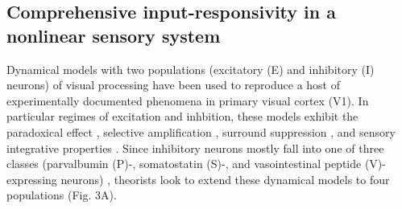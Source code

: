 \documentclass[11pt]{article}
\begin{document}
%
%
%
\subsection{Comprehensive input-responsivity in a nonlinear sensory system}
Dynamical models with two populations (excitatory (E) and inhibitory (I) neurons) of visual processing have been used to reproduce a host of experimentally documented phenomena in primary visual cortex (V1).  In particular regimes of excitation and inhbition, these models exhibit the paradoxical effect \cite{tsodyks1997paradoxical}, selective amplification \cite{murphy2009balanced}, surround suppression \cite{ozeki2009inhibitory}, and  sensory integrative properties \cite{rubin2015stabilized}.  Since inhibitory neurons mostly fall into one of three classes (parvalbumin (P)-, somatostatin (S)-, and vasointestinal peptide (V)-expressing neurons) \cite{markram2004interneurons, rudy2011three}, theorists look to extend these dynamical models to four populations \cite{litwin2016inhibitory} (Fig. 3A).
\end{document}
